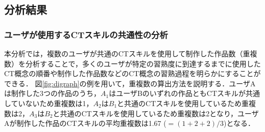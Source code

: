 \documentclass[submit]{ipsj}
\begin{document}


\vspace{-2mm}
\subsection{分析結果}\label{sec:3-analysis}

\subsubsection{ユーザが使用するCTスキルの共通性の分析}\label{subsec:path-analysis}

本分析では，複数のユーザが共通のCTスキルを使用して制作した作品数（重複数）を分析することで，多くのユーザが特定の習熟度に到達するまでに使用したCT概念の順番や制作した作品数などのCT概念の習熟過程を明らかにすることができる．%
図\ref{fig:digraph}の例を用いて，重複数の算出方法を説明する．ユーザAは制作した3つの作品のうち，$A_1$はユーザBのいずれの作品ともCTスキルが共通していないため重複数は1，$A_2$は$B_1$と共通のCTスキルを使用しているため重複数は2，$A_3$は$B_2$と共通のCTスキルを使用しているため重複数は2となり，ユーザAが制作した作品のCTスキルの平均重複数は1.67 ($=(1 + 2 + 2) / 3$)となる．
\end{document}
